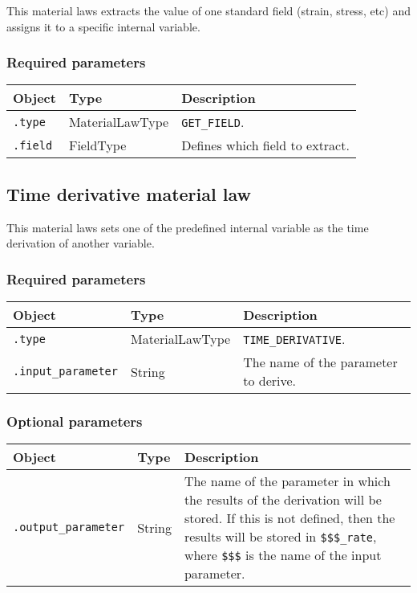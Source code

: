 \documentclass[10pt]{article}
\begin{document}
This material laws extracts the value of one standard field (strain, stress, etc) and assigns it to a specific internal variable.

\subsubsection*{Required parameters}

\begin{tabularx}{\textwidth}{llX}
\hline 
Object & Type & Description \\ 
\hline 
\verb+.type+ & MaterialLawType & \verb+GET_FIELD+. \\ 
\verb+.field+ & FieldType & Defines which field to extract.\\
\hline 
\end{tabularx}

\subsection{Time derivative material law}

This material laws sets one of the predefined internal variable as the time derivation of another variable.

\subsubsection*{Required parameters}

\begin{tabularx}{\textwidth}{llX}
\hline 
Object & Type & Description \\ 
\hline 
\verb+.type+ & MaterialLawType & \verb+TIME_DERIVATIVE+. \\ 
\verb+.input_parameter+ & String & The name of the parameter to derive.\\
\hline 
\end{tabularx}


\subsubsection*{Optional parameters}

\begin{tabularx}{\textwidth}{llX}
\hline 
Object & Type & Description \\ 
\hline 
\verb+.output_parameter+ & String & The name of the parameter in which the results of the derivation will be stored. If this is not defined, then the results will be stored in \verb+$$$_rate+, where \verb+$$$+ is the name of the input parameter.\\
\hline 
\end{tabularx}
\end{document}

